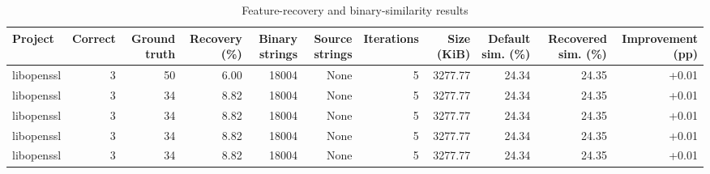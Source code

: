 \begin{table}[htbp]
\centering
\caption{Feature-recovery and binary-similarity results}
\label{tab:feature-recovery-results}
\small
\begin{tabular}{lrrrrrrrrrr}
\toprule
Project & Correct & Ground truth & Recovery (\%) & Binary strings & Source strings & Iterations & Size (KiB) & Default sim. (\%) & Recovered sim. (\%) & Improvement (pp) \\
\midrule
libopenssl & 3 & 50 & 6.00 & 18004 & None & 5 & 3277.77 & 24.34 & 24.35 & +0.01 \\
libopenssl & 3 & 34 & 8.82 & 18004 & None & 5 & 3277.77 & 24.34 & 24.35 & +0.01 \\
libopenssl & 3 & 34 & 8.82 & 18004 & None & 5 & 3277.77 & 24.34 & 24.35 & +0.01 \\
libopenssl & 3 & 34 & 8.82 & 18004 & None & 5 & 3277.77 & 24.34 & 24.35 & +0.01 \\
libopenssl & 3 & 34 & 8.82 & 18004 & None & 5 & 3277.77 & 24.34 & 24.35 & +0.01 \\
\bottomrule
\end{tabular}
\end{table}
